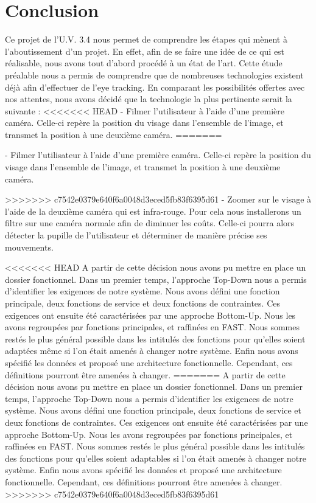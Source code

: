 \chapter{Conclusion}


Ce projet de l'U.V. 3.4 nous permet de comprendre les étapes qui mènent à l'aboutissement d'un projet. En effet, afin de se faire une idée de ce qui est réalisable, nous avons tout d'abord procédé à un état de l'art. Cette étude préalable nous a permis de comprendre que de nombreuses technologies existent déjà afin d'effectuer de l'eye tracking. En comparant les possibilités offertes avec nos attentes, nous avons décidé que la technologie la plus pertinente serait la suivante :
<<<<<<< HEAD
- Filmer l'utilisateur à l'aide d'une première caméra. Celle-ci repère la position du visage dans l'ensemble de l'image, et transmet la position à une deuxième caméra.
=======

- Filmer l'utilisateur à l'aide d'une première caméra. Celle-ci repère la position du visage dans l'ensemble de l'image, et transmet la position à une deuxième caméra.

>>>>>>> c7542e0379e640f6a0048d3eced5fb83f6395d61
- Zoomer sur le visage à l'aide de la deuxième caméra qui est infra-rouge. Pour cela nous installerons  un filtre sur une caméra normale afin de diminuer les coûts. Celle-ci pourra alors détecter la pupille de l'utilisateur et déterminer de manière précise ses mouvements.

\vspace*{1cm}

<<<<<<< HEAD
A partir de cette décision nous avons pu mettre en place un dossier fonctionnel. Dans un premier temps, l'approche Top-Down nous a permis d'identifier les exigences de notre système. Nous avons défini une fonction  principale, deux fonctions de service et deux fonctions de contraintes. Ces exigences ont ensuite été caractérisées par une approche Bottom-Up. Nous les avons regroupées par fonctions principales, et raffinées en FAST. Nous sommes restés le plus général possible dans les intitulés des fonctions pour qu'elles soient adaptées même si l'on était amenés à changer notre système. Enfin nous avons spécifié les données et proposé une architecture fonctionnelle. Cependant, ces définitions pourront être amenées à changer.
=======
A partir de cette décision nous avons pu mettre en place un dossier fonctionnel. Dans un premier temps, l'approche Top-Down nous a permis d'identifier les exigences de notre système. Nous avons défini une fonction  principale, deux fonctions de service et deux fonctions de contraintes. Ces exigences ont ensuite été caractérisées par une approche Bottom-Up. Nous les avons regroupées par fonctions principales, et raffinées en FAST. Nous sommes restés le plus général possible dans les intitulés des fonctions pour qu'elles soient adaptables si l'on était amenés à changer notre système. Enfin nous avons spécifié les données et proposé une architecture fonctionnelle. Cependant, ces définitions pourront être amenées à changer.
>>>>>>> c7542e0379e640f6a0048d3eced5fb83f6395d61


